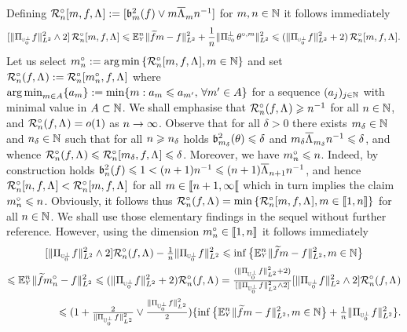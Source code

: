 \begin{te}
\begin{equation}
  \end{equation}
Defining 
$\oRaDi{\Di,\xdf,\iSv}:=[\bias^2(\xdf)\vee\Di \oiSv \ssY^{-1}]$ for $\Di,\ssY\in\Nz$   it follows immediately
\begin{equation}\label{oo:e2}
[\VnormLp{\Proj[{\mHiH[0]^\perp}]\xdf}^2\wedge2]\,\oRaDi{\Di,\xdf,\iSv}\leq \FuEx[\ssY]{\rY}\VnormLp{\txdfPr-\xdf}^2+ \frac{1}{n}\VnormLp{\ProjC[{\mHiH[0]}]\xdfPr}^2\leq (\VnormLp{\Proj[{\mHiH[0]^\perp}]\xdf}^2+2)\,\oRaDi{\Di,\xdf,\iSv}.
  \end{equation}
Let us select 
    $\oDi{\ssY}:=\argmin\Nset[{\Di\in\Nz}]{\oRaDi{\Di,\xdf,\iSv}}$ and set
    $\oRa{\xdf,\iSv}:=\oRaDi{\oDi{\ssY},\xdf,\iSv}$ 
 where
$\argmin\nolimits_{m\in A}\{a_m\}:=\min\{m: a_m\leq a_{m'},\,\forall
m'\in A\}$ for a sequence $\Nsuite{a_j}$ with minimal value in
$A\subset \Nz$. We shall emphasise that  $\oRa{\xdf,\iSv}\geq
\ssY^{-1}$ for all $\ssY\in\Nz$, and $\oRa{\xdf,\iSv}=o(1)$ as
$\ssY\to\infty$. Observe that for all $\delta>0$ there exists
$\Di_{\delta}\in\Nz$ and  $\ssY_\delta\in\Nz$ such that for
all $\ssY\geq \ssY_{\delta}$ holds $\bias[\Di_\delta]^2(\So)\leq \delta$ 
and $\Di_{\delta} \oiSv[\Di_\delta] \ssY^{-1}\leq\delta$, and
whence $\oRa{\xdf,\iSv}\leq\oRaDi{\Di_\delta,\xdf,\iSv}\leq \delta$.
Moreover, we have
$\oDi{\ssY}\leq \ssY$. Indeed, by construction holds $\bias[\ssY]^2(\xdf)\leq 1<(\ssY+1)\ssY^{-1}\leq
(\ssY+1)\oiSv[\ssY+1]{}\ssY^{-1}$, and hence  $\oRaDi{\ssY,\xdf,\iSv}<\oRaDi{\Di,\xdf,\iSv}$ for all $\Di\in \nsetro{\ssY+1,\infty}$ which in turn implies
the claim $\oDi{\ssY}\leq \ssY$. Obviously, it follows thus $\oRa{\xdf,\iSv}=\min\set{
    \oRaDi{\Di,\xdf,\iSv} ,\Di\in\nset{1,\ssY}}$ for all $\ssY\in\Nz$. We shall use
  those elementary findings in the sequel without further reference.
 However, using the dimension $\oDi{\ssY}\in\nset{1,\ssY}$ it follows immediately 
  \begin{multline}\label{oo:e3}
[\VnormLp{\Proj[{\mHiH[0]^\perp}]\xdf}^2\wedge2]\oRa{\xdf,\iSv}- \tfrac{1}{n}\VnormLp{\Proj[{\mHiH[0]^\perp}]\xdf}^2
\leq 
 \inf\NsetB[\Di\in\Nz]{\FuEx[\ssY]{\rY}\VnormLp{\txdfPr-\xdf}^2}\\\hfill\leq
\FuEx[\ssY]{\rY}\VnormLp{\txdfPr[\oDi{\ssY}]-\xdf}^2\leq(\VnormLp{\Proj[{\mHiH[0]^\perp}]\xdf}^2+2)\oRa{\xdf,\iSv}=\tfrac{(\VnormLp{\Proj[{\mHiH[0]^\perp}]\xdf}^2+2)}{[\VnormLp{\Proj[{\mHiH[0]^\perp}]\xdf}^2\wedge2]}[\VnormLp{\Proj[{\mHiH[0]^\perp}]\xdf}^2\wedge2]\oRa{\xdf,\iSv}
\\\hfill\leq(1+\tfrac{2}{\VnormLp{\Proj[{\mHiH[0]^\perp}]\xdf}^2}\vee\tfrac{\VnormLp{\Proj[{\mHiH[0]^\perp}]\xdf}^2}{2})\{\inf\NsetB[\Di\in\Nz]{\FuEx[\ssY]{\rY}\VnormLp{\txdfPr-\xdf}^2}+\tfrac{1}{n}\VnormLp{\Proj[{\mHiH[0]^\perp}]\xdf}^2\}.

\end{multline}
\end{te}
